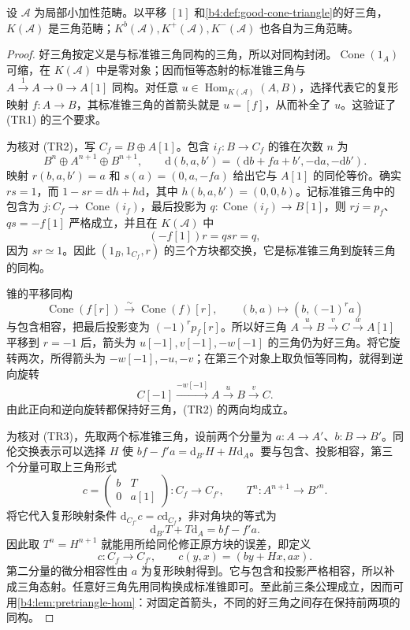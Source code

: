 \begin{theorem}\label{b4:thm:homotopy-triangulated}
	设 \(\mathcal A\) 为局部小加性范畴。以平移 \([1]\) 和\cref{b4:def:good-cone-triangle}的好三角，\(K(\mathcal A)\) 是三角范畴；\(K^b(\mathcal A),K^+(\mathcal A),K^-(\mathcal A)\) 也各自为三角范畴。
\end{theorem}
\begin{proof}
	好三角按定义是与标准锥三角同构的三角，所以对同构封闭。\(\operatorname{Cone}(1_A)\) 可缩，在 \(K(\mathcal A)\) 中是零对象；因而恒等态射的标准锥三角与 \(A\xrightarrow{1}A\to0\to A[1]\) 同构。对任意 \(u\in\operatorname{Hom}_{K(\mathcal A)}(A,B)\)，选择代表它的复形映射 \(f:A\to B\)，其标准锥三角的首箭头就是 \(u=[f]\)，从而补全了 \(u\)。这验证了 (TR1) 的三个要求。

	为核对 (TR2)，写 \(C_f=B\oplus A[1]\)。包含 \(i_f:B\to C_f\) 的锥在次数 \(n\) 为
	\[
		B^n\oplus A^{n+1}\oplus B^{n+1},\qquad \mathrm{d}(b,a,b')=(\mathrm{d}b+fa+b',-\mathrm{d}a,-\mathrm{d}b').
	\]
	映射 \(r(b,a,b')=a\) 和 \(s(a)=(0,a,-fa)\) 给出它与 \(A[1]\) 的同伦等价。确实 \(rs=1\)，而 \(1-sr=\mathrm{d}h+h\mathrm{d}\)，其中 \(h(b,a,b')=(0,0,b)\)。记标准锥三角中的包含为 \(j:C_f\to\operatorname{Cone}(i_f)\)，最后投影为 \(q:\operatorname{Cone}(i_f)\to B[1]\)，则 \(rj=p_f\)、\(qs=-f[1]\) 严格成立，并且在 \(K(\mathcal A)\) 中
	\[
		(-f[1])r=qsr=q,
	\]
	因为 \(sr\simeq1\)。因此 \((1_B,1_{C_f},r)\) 的三个方块都交换，它是标准锥三角到旋转三角的同构。

	锥的平移同构
	\[
		\operatorname{Cone}(f[r])\xrightarrow{\sim}\operatorname{Cone}(f)[r], \qquad (b,a)\longmapsto(b,(-1)^ra)
	\]
	与包含相容，把最后投影变为 \((-1)^rp_f[r]\)。所以好三角 \(A\xrightarrow{u}B\xrightarrow{v}C\xrightarrow{w}A[1]\) 平移到 \(r=-1\) 后，箭头为 \(u[-1],v[-1],-w[-1]\) 的三角仍为好三角。将它旋转两次，所得箭头为 \(-w[-1],-u,-v\)；在第三个对象上取负恒等同构，就得到逆向旋转
	\[
		C[-1]\xrightarrow{-w[-1]}A\xrightarrow{u}B\xrightarrow{v}C.
	\]
	由此正向和逆向旋转都保持好三角，(TR2) 的两向均成立。

	为核对 (TR3)，先取两个标准锥三角，设前两个分量为 \(a:A\to A'\)、\(b:B\to B'\)。同伦交换表示可以选择 \(H\) 使 \(bf-f'a=\mathrm{d}_{B'}H+H\mathrm{d}_A\)。要与包含、投影相容，第三个分量可取上三角形式
	\[
		c=\begin{pmatrix}b&T\\0&a[1]\end{pmatrix}:C_f\longrightarrow C_{f'},
		\qquad T^n:A^{n+1}\longrightarrow B'^n.
	\]
	将它代入复形映射条件 \(\mathrm{d}_{C_{f'}}c=c\mathrm{d}_{C_f}\)，非对角块的等式为
	\[
		\mathrm{d}_{B'}T+T\mathrm{d}_A=bf-f'a.
	\]
	因此取 \(T^n=H^{n+1}\) 就能用所给同伦修正原方块的误差，即定义
	\[
		c:C_f\longrightarrow C_{f'},\qquad c(y,x)=(by+Hx,ax).
	\]
	第二分量的微分相容性由 \(a\) 为复形映射得到。它与包含和投影严格相容，所以补成三角态射。任意好三角先用同构换成标准锥即可。至此前三条公理成立，因而可用\cref{b4:lem:pretriangle-hom}：对固定首箭头，不同的好三角之间存在保持前两项的同构。


\end{proof}
